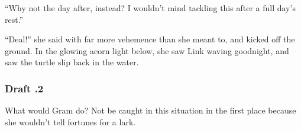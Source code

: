 \documentclass[../FGP.tex]{subfiles}
\begin{document}
\begin{fragment}
``Why not the day after, instead? I wouldn't mind tackling this after a full day's rest.'' 

``Deal!'' she said with far more vehemence than she meant to, and kicked off the ground. In the glowing acorn light below, she saw Link waving goodnight, and saw the turtle slip back in the water. 

\subsubsection{Draft \thefragment.2}
What would Gram do? Not be caught in this situation in the first place because she wouldn't tell fortunes for a lark. 
\end{fragment}
\end{document}
